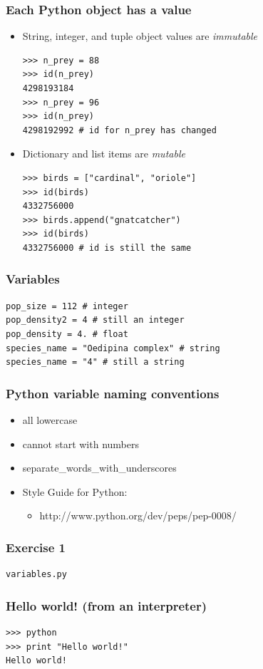 \documentclass{beamer}
\begin{document}
\begin{frame}[fragile]
\frametitle{Each Python object has a value}
\begin{itemize}
\item String, integer, and tuple object values are \emph{immutable}
\begin{lstlisting}
>>> n_prey = 88
>>> id(n_prey)
4298193184
>>> n_prey = 96
>>> id(n_prey)
4298192992 # id for n_prey has changed
\end{lstlisting}
\item Dictionary and list items are \emph{mutable}
\begin{lstlisting}
>>> birds = ["cardinal", "oriole"]
>>> id(birds)
4332756000
>>> birds.append("gnatcatcher")
>>> id(birds)
4332756000 # id is still the same
\end{lstlisting}
\end{itemize}
\end{frame}

\begin{frame}[fragile]
\frametitle{Variables}
\begin{lstlisting}
pop_size = 112 # integer
pop_density2 = 4 # still an integer
pop_density = 4. # float
species_name = "Oedipina complex" # string
species_name = "4" # still a string
\end{lstlisting}
\end{frame}

\begin{frame}[fragile]
\frametitle{Python variable naming conventions}
\begin{itemize}
\item all lowercase
\item cannot start with numbers
\item separate\_words\_with\_underscores
\item Style Guide for Python: 
\begin{itemize}
\item http://www.python.org/dev/peps/pep-0008/
\end{itemize}
\end{itemize}
\end{frame}

\begin{frame}[fragile]
\frametitle{Exercise 1}
\begin{lstlisting}
variables.py
\end{lstlisting}
\end{frame}

\begin{frame}[fragile]
\frametitle{Hello world! (from an interpreter)}
\begin{lstlisting}
>>> python
>>> print "Hello world!"
Hello world!
\end{lstlisting}
\end{frame}
\end{document}
